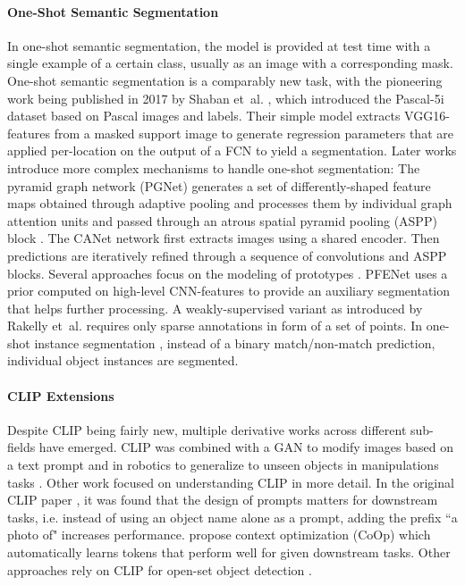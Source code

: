 \paragraph{One-Shot Semantic Segmentation}
In one-shot semantic segmentation, the model is provided at test time with a single example of a certain class, usually as an image with a corresponding mask. 
One-shot semantic segmentation is a comparably new task, with the pioneering work being published in 2017 by Shaban et~al. \cite{shaban17}, which introduced the Pascal-5i dataset based on Pascal images and labels.
Their simple model extracts VGG16-features \cite{simonyan14} from a masked support image to generate regression parameters that are applied per-location on the output of a FCN \cite{long15} to yield a segmentation. 
Later works introduce more complex mechanisms to handle one-shot segmentation:
The pyramid graph network (PGNet) \cite{zhang19d} generates a set of differently-shaped feature maps obtained through adaptive pooling and processes them by individual graph attention units and passed through an atrous spatial pyramid pooling (ASPP) block \cite{chen18a}.
The CANet network \cite{zhang19a} first extracts images using a shared encoder. Then predictions are iteratively refined through a sequence of convolutions and ASPP blocks.
Several approaches focus on the modeling of prototypes \cite{wang19a, yang20, liu20}.
PFENet \cite{tian20a} uses a prior computed on high-level CNN-features to provide an auxiliary segmentation that helps further processing.
A weakly-supervised variant as introduced by Rakelly et~al. \cite{rakelly18fewshot} requires only sparse annotations in form of a set of points.
In one-shot instance segmentation \cite{michaelis18}, instead of a binary match/non-match prediction, individual object instances are segmented.

\paragraph{CLIP Extensions}
Despite CLIP \cite{radford20} being fairly new, multiple derivative works across different sub-fields have emerged.
CLIP was combined with a GAN to modify images based on a text prompt \cite{patashnik21styleclip} and
in robotics to generalize to unseen objects in manipulations tasks \cite{shridhar21cliport}.
Other work focused on understanding CLIP in more detail. In the original CLIP paper \cite{radford20}, it was found that the design of prompts matters for downstream tasks, i.e. instead of using an object name alone as a prompt, adding the prefix ``a photo of" increases performance. \citet{zhou21coop} propose context optimization (CoOp) which automatically learns tokens that perform well for given downstream tasks.
Other approaches rely on CLIP for open-set object detection \cite{gu21zero, esmaeilpour21zero}.

